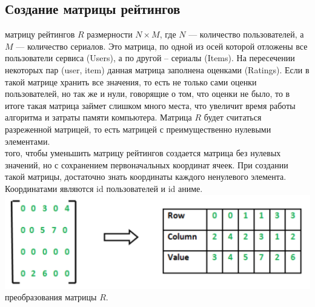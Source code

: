 \documentclass{article}
\newcommand\tab[1][1cm]{\hspace*{#1}}
\begin{document}
\subsection{Создание матрицы рейтингов}
 матрицу рейтингов $R$ размерности $N\times M$, где $N$ — количество пользователей, а $M$ — количество сериалов. Это матрица, по одной из осей которой отложены все пользователи сервиса (Users), а по другой – сериалы (Items). На пересечении некоторых пар (user, item) данная матрица заполнена оценками (Ratings). Если в такой матрице хранить все значения, то есть не только сами оценки пользователей, но так же и нули, говорящие о том, что оценки не было, то в итоге такая матрица займет слишком много места, что увеличит время работы алгоритма и затраты памяти компьютера. Матрица  $R$ будет считаться разреженной матрицей, то есть матрицей с преимущественно нулевыми элементами. \\
 того, чтобы уменьшить матрицу рейтингов создается матрица без нулевых значений, но с сохранением первоначальных координат ячеек. При создании такой матрицы, достаточно знать координаты каждого ненулевого элемента. Координатами являются id пользователей и id аниме.\\
\includegraphics[scale=0.8]{f11.png}\\
 преобразования матрицы  $R$.
\end{document}
